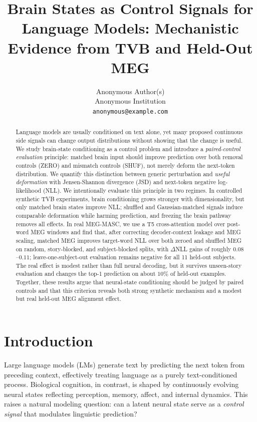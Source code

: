 \documentclass{article}
\title{Brain States as Control Signals for Language Models: Mechanistic Evidence from TVB and Held-Out MEG}
\author{%
  Anonymous Author(s) \\
  Anonymous Institution \\
  \texttt{anonymous@example.com}
}
\theoremstyle{plain}
\theoremstyle{definition}
\theoremstyle{remark}
\begin{document}
\maketitle

\begin{abstract}
Language models are usually conditioned on text alone, yet many proposed continuous side signals can change output distributions without showing that the change is useful.
We study brain-state conditioning as a control problem and introduce a \emph{paired-control evaluation} principle: matched brain input should improve prediction over both removal controls (ZERO) and mismatch controls (SHUF), not merely deform the next-token distribution.
We quantify this distinction between generic perturbation and \emph{useful deformation} with Jensen-Shannon divergence (JSD) and next-token negative log-likelihood (NLL).
We intentionally evaluate this principle in two regimes.
In controlled synthetic TVB experiments, brain conditioning grows stronger with dimensionality, but only matched brain states improve NLL; shuffled and Gaussian-matched signals induce comparable deformation while harming prediction, and freezing the brain pathway removes all effects.
In real MEG-MASC, we use a T5 cross-attention model over post-word MEG windows and find that, after correcting decoder-context leakage and MEG scaling, matched MEG improves target-word NLL over both zeroed and shuffled MEG on random, story-blocked, and subject-blocked splits, with $\Delta$NLL gains of roughly $0.08$--$0.11$; leave-one-subject-out evaluation remains negative for all 11 held-out subjects.
The real effect is modest rather than full neural decoding, but it survives unseen-story evaluation and changes the top-1 prediction on about $10\%$ of held-out examples.
Together, these results argue that neural-state conditioning should be judged by paired controls and that this criterion reveals both strong synthetic mechanism and a modest but real held-out MEG alignment effect.
\end{abstract}

\section{Introduction}
\label{introduction}

Large language models (LMs) generate text by predicting the next token from preceding context, effectively treating language as a purely text-conditioned process.
Biological cognition, in contrast, is shaped by continuously evolving neural states reflecting perception, memory, affect, and internal dynamics.
This raises a natural modeling question: can a latent neural state serve as a \emph{control signal} that modulates linguistic prediction?
\end{document}
